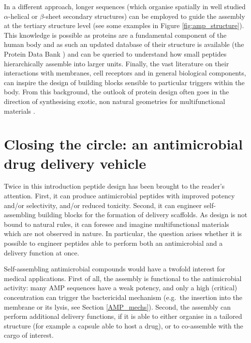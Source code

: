 In a different approach, longer sequences (which organise spatially in well studied $\alpha$-helical or $\beta$-sheet secondary structures) can be employed to guide the assembly at the tertiary structure level (see some examples in Figure \ref{fig:amp_structure}).
%
This knowledge is possible as proteins are a fundamental component of the human body and as such an updated database of their structure is available (the Protein Data Bank \citep{PDB}) and can be queried to understand how small peptides hierarchically assemble into larger units.
%
Finally, the vast literature on their interactions with membranes, cell receptors and in general biological components, can inspire the design of building blocks sensible to particular triggers within the body. From this background, the outlook of protein design often goes in the direction of synthesising exotic, non natural geometries for multifunctional materials \citep{Yeates2019,Malay2019}.


\section{Closing the circle: an antimicrobial drug delivery vehicle}

Twice in this introduction peptide design has been brought to the reader's attention. First, it can produce antimicrobial peptides with improved potency and/or selectivity, and/or reduced toxicity. Second, it can engineer self-assembling building blocks for the formation of delivery scaffolds. As design is not bound to natural rules, it can foresee and imagine multifunctional materials which are not observed in nature. In particular, the question arises whether it is possible to engineer peptides able to perform both an antimicrobial and a delivery function at once.

Self-assembling antimicrobial compounds would have a twofold interest for medical applications.
%
First of all, the assembly is functional to the antimicrobial activity: many AMP sequences have a weak potency, and only a high (critical) concentration can trigger the bactericidal mechanism (e.g.\ the insertion into the membrane or its lysis, see Section \ref{AMP_mechs}).
%
%
Second, the assembly can perform additional delivery functions, if it is able to either organise in a tailored structure (for example a capsule able to host a drug), or to co-assemble with the cargo of interest.

